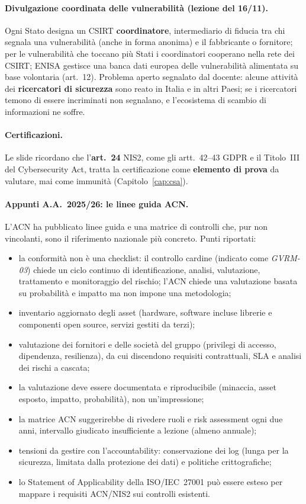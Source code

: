 \paragraph{Divulgazione coordinata delle vulnerabilità (lezione del 16/11).} Ogni Stato designa un
CSIRT \textbf{coordinatore}, intermediario di fiducia tra chi segnala una vulnerabilità (anche in forma
anonima) e il fabbricante o fornitore; per le vulnerabilità che toccano più Stati i coordinatori
cooperano nella rete dei CSIRT; ENISA gestisce una banca dati europea delle vulnerabilità alimentata
su base volontaria (art.~12). Problema aperto segnalato dal docente: alcune attività dei
\textbf{ricercatori di sicurezza} sono reato in Italia e in altri Paesi; se i ricercatori temono di
essere incriminati non segnalano, e l'ecosistema di scambio di informazioni ne soffre.

\paragraph{Certificazioni.} Le slide ricordano che l'\textbf{art.~24} NIS2, come gli artt.~42--43 GDPR e
il Titolo~III del Cybersecurity Act, tratta la certificazione come \textbf{elemento di prova} da
valutare, mai come immunità (Capitolo~\ref{cap:csa}).

\paragraph{Appunti A.A.~2025/26: le linee guida ACN.} L'ACN ha pubblicato linee guida e una matrice di
controlli che, pur non vincolanti, sono il riferimento nazionale più concreto. Punti riportati:
\begin{itemize}
  \item la conformità non è una checklist: il controllo cardine (indicato come \emph{GVRM-03}) chiede
    un ciclo continuo di identificazione, analisi, valutazione, trattamento e monitoraggio del rischio;
    l'ACN chiede una valutazione basata su probabilità e impatto ma non impone una metodologia;
  \item inventario aggiornato degli asset (hardware, software incluse librerie e componenti open
    source, servizi gestiti da terzi);
  \item valutazione dei fornitori e delle società del gruppo (privilegi di accesso, dipendenza,
    resilienza), da cui discendono requisiti contrattuali, SLA e analisi dei rischi a cascata;
  \item la valutazione deve essere documentata e riproducibile (minaccia, asset esposto, impatto,
    probabilità), non un'impressione;
  \item la matrice ACN suggerirebbe di rivedere ruoli e risk assessment ogni due anni, intervallo
    giudicato insufficiente a lezione (almeno annuale);
  \item tensioni da gestire con l'accountability: conservazione dei log (lunga per la sicurezza,
    limitata dalla protezione dei dati) e politiche crittografiche;
  \item lo Statement of Applicability della ISO/IEC~27001 può essere esteso per mappare i requisiti
    ACN/NIS2 sui controlli esistenti.
\end{itemize}

